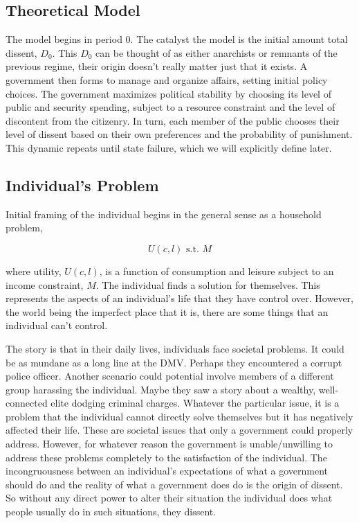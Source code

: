 \documentclass[12pt]{article}
\begin{document}
\begin{spacing}{1.5}
\section{Theoretical Model}

The model begins in period 0. The catalyst the model is the initial amount total dissent, $D_0$. This $D_0$ can be thought of as either anarchists or remnants of the previous regime, their origin doesn't really matter just that it exists. A government then forms to manage and organize affairs, setting initial policy choices. The government maximizes political stability by choosing its level of public and security spending, subject to a resource constraint and the level of discontent from the citizenry. In turn, each member of the public chooses their level of dissent based on their own preferences and the probability of punishment. This dynamic repeats until state failure, which we will explicitly define later. 
 
\subsection{Individual's Problem}
Initial framing of the individual begins in the general sense as a household problem, 

\begin{equation}
	U(c,l) \text{ s.t. } M
\end{equation}

\noindent where utility, $U(c,l)$, is a function of consumption and leisure subject to an income constraint, $M$. The individual finds a solution for themselves. This represents the aspects of an individual's life that they have control over. However, the world being the imperfect place that it is, there are some things that an individual can't control.  

The story is that in their daily lives, individuals face societal problems. It could be as mundane as a long line at the DMV. Perhaps they encountered a corrupt police officer. Another scenario could potential involve members of a different group harassing the individual. Maybe they saw a story about a wealthy, well-connected elite dodging criminal charges. Whatever the particular issue, it is a problem that the individual cannot directly solve themselves but it has negatively affected their life. These are societal issues that only a government could properly address. However, for whatever reason the government is unable/unwilling to address these problems completely to the satisfaction of the individual. The incongruousness between an individual's expectations of what a government should do and the reality of what a government does do is the origin of dissent. So without any direct power to alter their situation the individual does what people usually do in such situations, they dissent. 


\end{spacing}
\end{document}
